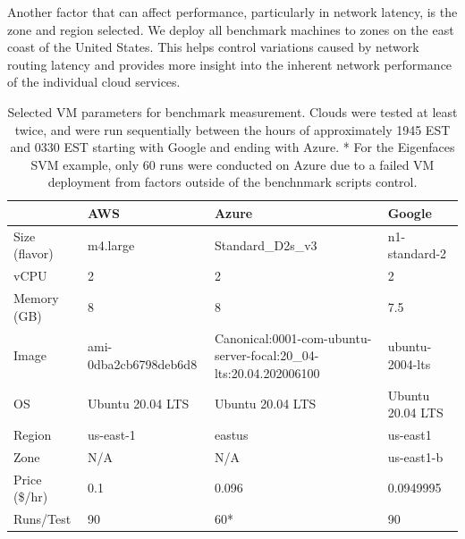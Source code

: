 Another factor that can affect performance, particularly in network
latency, is the zone and region selected. We deploy all benchmark
machines to zones on the east coast of the United States. This helps
control variations caused by network routing latency and provides more
insight into the inherent network performance of the individual cloud
services.


\begin{table}
  
\caption{Selected VM parameters for benchmark measurement.
Clouds were tested at least twice, and were run sequentially between the
hours of approximately 1945 EST and 0330 EST starting with Google and
ending with Azure. * For the Eigenfaces SVM example, only 60 runs were
conducted on Azure due to a failed VM deployment from factors outside of
the benchnmark scripts control.}
\label{tab:1}

\begin{tabular}[]{@{}llll@{}}
\toprule
\begin{minipage}[b]{0.13\columnwidth}\raggedright
\strut
\end{minipage} & \begin{minipage}[b]{0.17\columnwidth}\raggedright
AWS\strut
\end{minipage} & \begin{minipage}[b]{0.47\columnwidth}\raggedright
Azure\strut
\end{minipage} & \begin{minipage}[b]{0.12\columnwidth}\raggedright
Google\strut
\end{minipage}\tabularnewline
\midrule
Size (flavor)
& 
m4.large
& 
Standard\_D2s\_v3 & 
n1-standard-2
\tabularnewline
vCPU & 2 & 2 & 2
\tabularnewline
Memory (GB) & 8 & 8 & 7.5
\tabularnewline
Image & ami-0dba2cb6798deb6d8
& \begin{minipage}[t]{0.80\columnwidth}\raggedright
Canonical:0001-com-ubuntu-server-focal:20\_04-lts:20.04.202006100\strut
\end{minipage} & 
ubuntu-2004-lts
\tabularnewline
OS & Ubuntu 20.04 LTS & Ubuntu 20.04 LTS & Ubuntu 20.04 LTS
\tabularnewline
Region & us-east-1 & eastus & us-east1
\tabularnewline
Zone &  N/A &  N/A & us-east1-b
\tabularnewline
Price (\$/hr)
&  0.1 & 0.096 & 0.0949995
\tabularnewline
Runs/Test
& \begin{minipage}[t]{0.17\columnwidth}\raggedright
90\strut
\end{minipage} & \begin{minipage}[t]{0.47\columnwidth}\raggedright
60*\strut
\end{minipage} & \begin{minipage}[t]{0.12\columnwidth}\raggedright
90\strut
\end{minipage}\tabularnewline
\bottomrule
\end{tabular}
\end{table}

